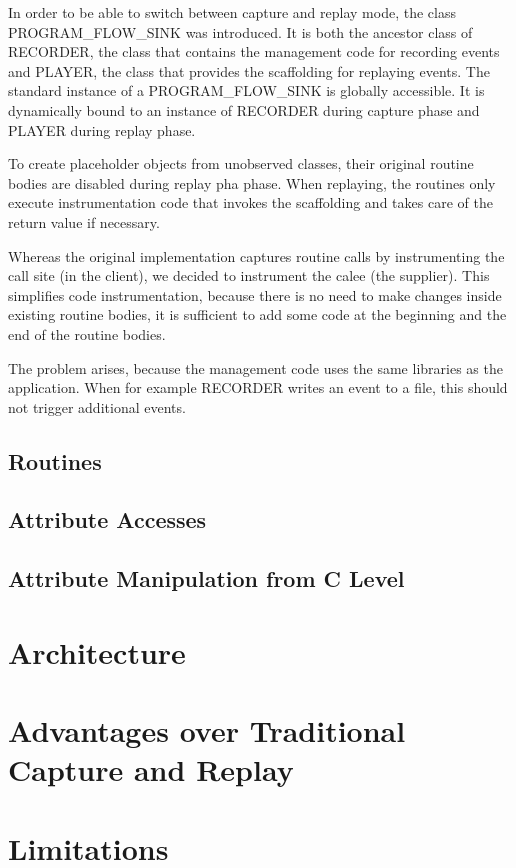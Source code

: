 In order to be able to switch between capture and replay mode, the class PROGRAM\_FLOW\_SINK was introduced. It is both the ancestor class of RECORDER, the class that contains the management code for recording events and PLAYER, the class that provides the scaffolding for replaying events. The standard instance of a PROGRAM\_FLOW\_SINK is globally accessible. It is dynamically bound to an instance of RECORDER during capture phase and PLAYER during replay phase.

To create placeholder objects from unobserved classes, their original routine bodies are disabled during replay pha phase. When replaying, the routines only execute instrumentation code that invokes the scaffolding and takes care of the return value if necessary.

Whereas the original implementation captures routine calls by instrumenting the call site (in the client), we decided to instrument the calee (the supplier). This simplifies code instrumentation, because there is no need to make changes inside existing routine bodies, it is sufficient to add some code at the beginning and the end of the routine bodies. %


The problem arises, because the management code uses the same libraries as the application. When for example RECORDER writes an event to a file, this should not trigger additional events.  
\subsection{Routines}
\subsection{Attribute Accesses}
\subsection{Attribute Manipulation from C Level}



\section{Architecture}
\section{Advantages over Traditional Capture and Replay}
\section{Limitations}
